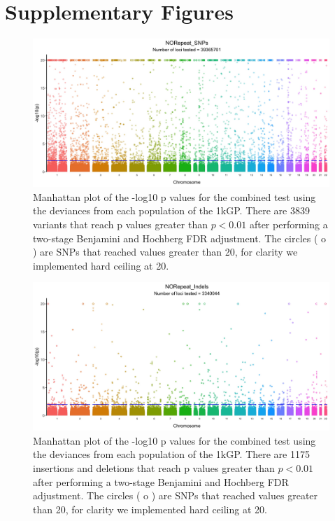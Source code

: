 \documentclass[9pt,lineno]{elife}
\begin{document}


\clearpage
\section{Supplementary Figures}

\renewcommand{\thefigure}{S\arabic{figure}}
\setcounter{figure}{0}   	

\begin{figure}[h]
\includegraphics[width=\hsize,keepaspectratio]{./Figures/ManhattanPlot_NORepeat_SNPs.jpg}

\caption{Manhattan plot of the -log10 p values for the combined test using the deviances from each population of the 1kGP. 
There are 3839 variants that reach p values greater than $ p < 0.01$ after performing a two-stage Benjamini and Hochberg FDR adjustment. 
The circles ( o ) are SNPs that reached values greater than 20, for clarity we implemented hard ceiling at 20.}
 \label{NRS_Manhattan}
\end{figure}

\begin{figure}[h]
\includegraphics[width=\hsize,keepaspectratio]{./Figures/ManhattanPlot_NORepeat_Indels.jpg}

\caption{Manhattan plot of the -log10 p values for the combined test using the deviances from each population of the 1kGP. 
There are 1175 insertions and deletions that reach p values greater than $ p < 0.01$ after performing a two-stage Benjamini and Hochberg FDR adjustment. 
The circles ( o ) are SNPs that reached values greater than 20, for clarity we implemented hard ceiling at 20.}
 \label{NRI_Manhattan}
\end{figure}
\end{document}
